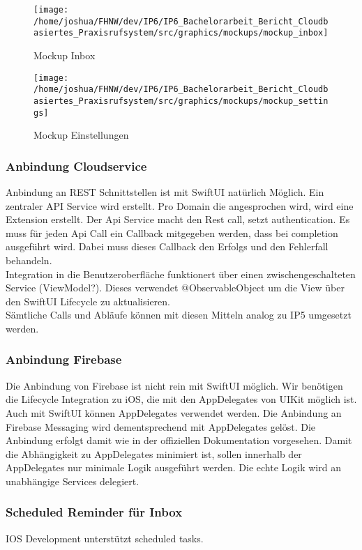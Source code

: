 \begin{figure}[h]
    \centering
    \begin{minipage}[b]{0.4\textwidth}
        \texttt{[image: /home/joshua/FHNW/dev/IP6/IP6\_Bachelorarbeit\_Bericht\_Cloudbasiertes\_Praxisrufsystem/src/graphics/mockups/mockup\_inbox]}
        \caption{Mockup Inbox}
    \end{minipage}
    \hfill
    \begin{minipage}[b]{0.4\textwidth}
        \texttt{[image: /home/joshua/FHNW/dev/IP6/IP6\_Bachelorarbeit\_Bericht\_Cloudbasiertes\_Praxisrufsystem/src/graphics/mockups/mockup\_settings]}
        \caption{Mockup Einstellungen}
    \end{minipage}\label{fig:Mockups-Inbox-Settings}
\end{figure}


\subsubsection*{Anbindung Cloudservice}
Anbindung an REST Schnittstellen ist mit SwiftUI natürlich Möglich.
Ein zentraler API Service wird erstellt.
Pro Domain die angesprochen wird, wird eine Extension erstellt.
Der Api Service macht den Rest call, setzt authentication.
Es muss für jeden Api Call ein Callback mitgegeben werden, dass bei completion ausgeführt wird.
Dabei muss dieses Callback den Erfolgs und den Fehlerfall behandeln. \\

Integration in die Benutzeroberfläche funktionert über einen zwischengeschalteten Service (ViewModel?).
Dieses verwendet @ObservableObject um die View über den SwiftUI Lifecycle zu aktualisieren. \\

Sämtliche Calls und Abläufe können mit diesen Mitteln analog zu IP5 umgesetzt werden.


\subsubsection*{Anbindung Firebase}

Die Anbindung von Firebase ist nicht rein mit SwiftUI möglich.
Wir benötigen die Lifecycle Integration zu iOS, die mit den AppDelegates von UIKit möglich ist.
Auch mit SwiftUI können AppDelegates verwendet werden.
Die Anbindung an Firebase Messaging wird dementsprechend mit AppDelegates gelöst.
Die Anbindung erfolgt damit wie in der offiziellen Dokumentation vorgesehen.
Damit die Abhängigkeit zu AppDelegates minimiert ist, sollen innerhalb der AppDelegates nur minimale Logik ausgeführt werden.
Die echte Logik wird an unabhängige Services delegiert.


\subsubsection*{Scheduled Reminder für Inbox}
IOS Development unterstützt scheduled tasks.

\clearpage
